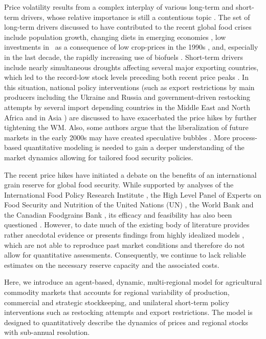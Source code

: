 \documentclass[12pt]{article}
\begin{document}
Price volatility results from a complex interplay of various long-term and short-term drivers, whose relative importance is still a contentious topic \cite{TAD14}. The set of long-term drivers discussed to have contributed to the recent global food crises include population growth, changing diets in emerging economies \cite{HEA10}, low investments in \RD~as a consequence of low crop-prices in the 1990s \cite{BRA08}, and, especially in the last decade, the rapidly increasing use of biofuels \cite{GOR13,FRA15}. Short-term drivers include nearly simultaneous droughts affecting several major exporting countries, which led to the record-low stock levels preceding both recent price peaks \cite{TRO11}. In this situation, national policy interventions (such as export restrictions by main producers including the Ukraine and Russia \cite{SHA11} and government-driven restocking attempts by several import depending countries in the Middle East and North Africa and in Asia \cite{TRO11,SCH17}) are discussed to have exacerbated the price hikes by further tightening the WM. Also, some authors argue that the liberalization of future markets in the early 2000s may have created speculative bubbles \cite{TAD14,LAG15}. More process-based quantitative modeling is needed to gain a deeper understanding of the market dynamics \cite{SCH17} allowing for tailored food security policies. 

The recent price hikes have initiated a debate on the benefits of an international grain reserve for global food security. While supported by analyses of the International Food Policy Research Institute \cite{BRA09a}, the High Level Panel of Experts on Food Security and Nutrition of the United Nations (UN) \cite{HLPE11}, the World Bank \cite{LIN08} and the Canadian Foodgrains Bank \cite{MCC11}, its efficacy and feasibility has also been questioned \cite{WRI12}. However, to date much of the existing body of literature provides rather anecdotal evidence \cite{BRA08} or presents findings from highly idealized models \cite{WIL91}, which are not able to reproduce past market conditions and therefore do not allow for quantitative assessments. Consequently, we continue to lack reliable estimates on the necessary reserve capacity and the associated costs.

Here, we introduce an agent-based, dynamic, multi-regional model for agricultural commodity markets that accounts for regional variability of production, commercial and strategic stockkeeping, and unilateral short-term policy interventions such as restocking attempts and export restrictions. The model is designed to quantitatively describe the dynamics of prices and regional stocks with sub-annual resolution.
\end{document}
